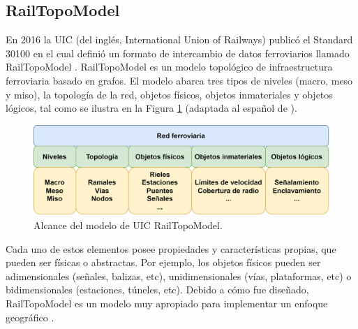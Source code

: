 \subsection{RailTopoModel}

    En 2016 la UIC (del inglés, International Union of Railways) publicó el Standard 30100 \cite{Paper_109} en el cual definió un formato de intercambio de datos ferroviarios llamado RailTopoModel \cite{Paper_11,Paper_146,Paper_149,Paper_150,Paper_200}. RailTopoModel es un modelo topológico de infraestructura ferroviaria basado en grafos. El modelo abarca tres tipos de niveles (macro, meso y miso), la topología de la red, objetos físicos, objetos inmateriales y objetos lógicos, tal como se ilustra en la Figura \ref{fig:RTM_3} (adaptada al español de \cite{Paper_109}). 

    \begin{figure}[H]
        \centering
        \includegraphics[width=1\textwidth]{Figuras/objetos}
        \centering\caption{Alcance del modelo de UIC RailTopoModel.}
        \label{fig:RTM_3}
    \end{figure}

    Cada uno de estos elementos posee propiedades y características propias, que pueden ser físicas o abstractas. Por ejemplo, los objetos físicos pueden ser adimensionales (señales, balizas, etc), unidimensionales (vías, plataformas, etc) o bidimensionales (estaciones, túneles, etc). Debido a cómo fue diseñado, RailTopoModel es un modelo muy apropiado para implementar un enfoque geográfico \cite{Paper_146,Paper_149,Paper_180,Paper_182,Paper_99,Paper_107}.
    




